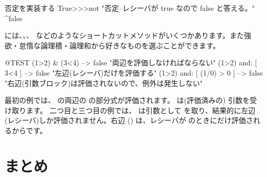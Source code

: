 \documentclass[a4paper,10pt,twoside]{book}
\begin{document}
\begin{method}{否定を実装する}
True>>>not
    "否定--レシーバが true なので false と答える。"
    ^false
\end{method}

 には、、、 などのようなショートカットメソッドがいくつかあります。また強欲・怠惰な論理積・論理和から好きなものを選ぶことができます。

\begin{code}{@TEST}
(1>2) & (3<4)              --> false    "両辺を評価しなければならない"
(1>2) and: [ 3<4 ]        --> false    "左辺(レシーバ)だけを評価する"
(1>2) and: [ (1/0) > 0 ] --> false    "右辺(引数ブロック)は評価されないので、例外は発生しない"
\end{code}

最初の例では、 の両辺の  の部分式が評価されます。\ct{&} は(評価済みの)  引数を受け取ります。
二つ目と三つ目の例では、 は引数として  を取り、結果的に左辺(レシーバ)しか評価されません。右辺 () は、レシーバが  のときにだけ評価されるからです。


\section{まとめ}
\end{document}
